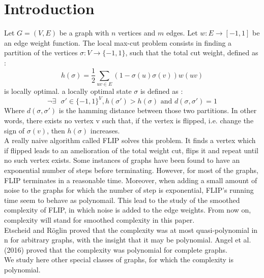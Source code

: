 \section{Introduction}

Let $G = (V,E)$ be a graph with $n$ vertices and $m$ edges.  Let $w : E \rightarrow [-1, 1]$ be an edge weight function. The local max-cut problem consists in finding a partition of the vertices $\sigma : V \rightarrow \{-1,1\}$, such that the total cut weight, defined as :
\begin{equation*}
h(\sigma) = \dfrac{1}{2}\sum_{uv \in E}(1 - \sigma(u)\sigma(v))w(uv)
\end{equation*}
is locally optimal. a locally optimal state $\sigma$ is defined as :
\begin{equation*}
\neg \exists \text{  }\sigma' \in \{-1, 1\}^V,  h(\sigma') > h(\sigma) \text{ and } d(\sigma, \sigma') = 1
\end{equation*}
Where $d(\sigma, \sigma')$ is the hamming distance between those two partitions. In other words, there exists no vertex v such that, if the vertex is flipped, i.e. change the sign of $\sigma(v)$, then $h(\sigma)$ increases.\\ 

A really naive algorithm called FLIP solves this problem. It finds a vertex which if flipped leads to an amelioration of the total weight cut, flips it and repeat until no such vertex exists. Some instances of graphs have been found to have an exponential number of steps before terminating. However, for most of the graphs, FLIP terminates in a reasonable time. Moreover, when adding a small amount of noise to the graphs for which the number of step is exponential, FLIP's running time seem to behave as polynomail. This lead to the study of the smoothed complexity of FLIP, in which noise is added to the edge weights. From now on, complexity will stand for smoothed complexity in this paper. \\

Etscheid and Röglin \cite{etscheid2017smoothed} proved that the complexity was at most quasi-polynomial in n for arbitrary graphs, with the insight that it may be polynomial. Angel et al. (2016) \cite{angel2016local} proved that the complexity was polynomial for complete graphs. \\
We study here other special classes of graphs, for which the complexity is polynomial.